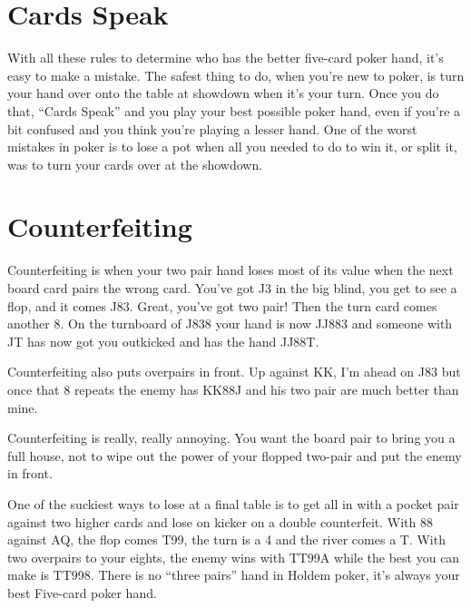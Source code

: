 \section{Cards Speak}

With all these rules to determine who has the better five-card poker
hand, it's easy to make a mistake. The safest thing to do, when you're
new to poker, is turn your hand over onto the table at showdown when
it's your turn. Once you do that, ``Cards Speak'' and you play your
best possible poker hand, even if you're a bit confused and you think
you're playing a lesser hand. One of the worst mistakes in poker is to
lose a pot when all you needed to do to win it, or split it, was to
turn your cards over at the showdown.

\section{Counterfeiting}

Counterfeiting is when your two pair hand loses most of its value when
the next board card pairs the wrong card. You've got J3 in the big
blind, you get to see a flop, and it comes J83. Great, you've got two
pair! Then the turn card comes another 8. On the turnboard of J838
your hand is now JJ883 and someone with JT has now got you outkicked
and has the hand JJ88T.

Counterfeiting also puts overpairs in front. Up against KK, I'm ahead
on J83 but once that 8 repeats the enemy has KK88J and his two pair
are much better than mine.

Counterfeiting is really, really annoying. You want the board pair to
bring you a full house, not to wipe out the power of your flopped
two-pair and put the enemy in front.

One of the suckiest ways to lose at a final table is to get all in
with a pocket pair against two higher cards and lose on kicker on a
double counterfeit. With 88 against AQ, the flop comes T99,
the turn is a 4 and the river comes a T. With two overpairs to your
eights, the enemy wins with TT99A while the best you can make is
TT998. There is no ``three pairs'' hand in Holdem poker, it's always
your best Five-card poker hand.
